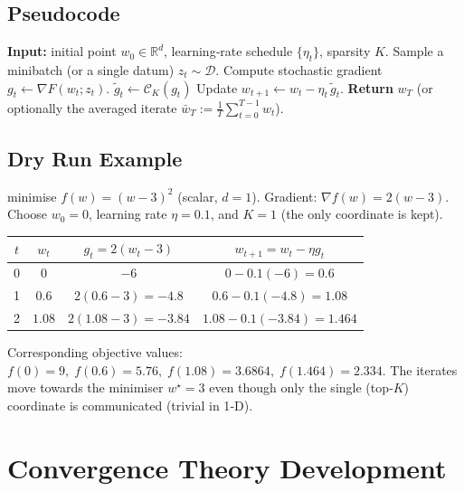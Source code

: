 \documentclass[11pt]{article}
\newcommand{\R}{\mathbb{R}}
\begin{document}
\subsection*{Pseudocode}
\begin{algorithm}[H]
\caption{Top‑\(K\) Stochastic Gradient Descent}
\begin{algorithmic}[1]
\State \textbf{Input:} initial point \(w_{0}\in\R^{d}\), learning‑rate schedule
\(\{\eta_t\}\), sparsity \(K\).
    \State Sample a minibatch (or a single datum) \(z_t\sim\mathcal{D}\).
    \State Compute stochastic gradient \(g_t\gets\nabla F(w_t;z_t)\).
    \State \(\tilde g_t\gets\mathcal{C}_K(g_t)\)   
    \State Update \(w_{t+1}\gets w_t-\eta_t\,\tilde g_t\).
\EndFor
\State \textbf{Return} \(w_T\) (or optionally the averaged iterate
\(\bar w_T:=\frac{1}{T}\sum_{t=0}^{T-1}w_t\)).
\end{algorithmic}
\end{algorithm}

\subsection*{Dry Run Example}
 minimise \(f(w)=(w-3)^2\) (scalar, \(d=1\)).  
 Gradient: \(\nabla f(w)=2(w-3)\).  
 Choose \(w_0=0\), learning rate \(\eta=0.1\), and \(K=1\) (the only coordinate is kept).

\begin{center}
\begin{tabular}{c|c|c|c}
$t$ & $w_t$ & $g_t=2(w_t-3)$ & $w_{t+1}=w_t-\eta g_t$ \\ \hline
0 & $0$ & $-6$ & $0-0.1(-6)=0.6$  \\
1 & $0.6$ & $2(0.6-3)=-4.8$ & $0.6-0.1(-4.8)=1.08$ \\
2 & $1.08$ & $2(1.08-3)=-3.84$ & $1.08-0.1(-3.84)=1.464$ \\
\end{tabular}
\end{center}
Corresponding objective values:
\(f(0)=9,\; f(0.6)=5.76,\; f(1.08)=3.6864,\; f(1.464)=2.334\).
The iterates move towards the minimiser \(w^\star=3\) even though only the
single (top‑\(K\)) coordinate is communicated (trivial in 1‑D).

\section*{Convergence Theory Development}
\end{document}
